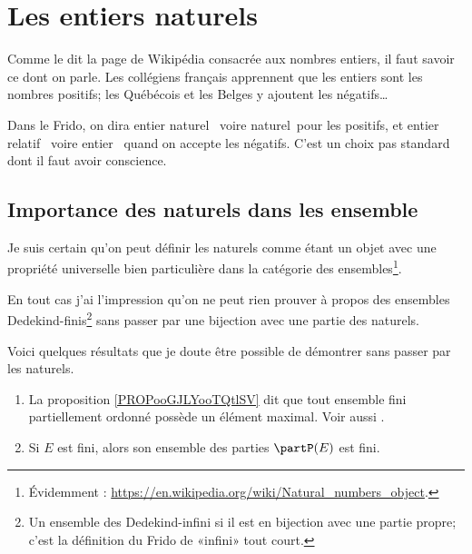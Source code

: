 

\section{Les entiers naturels}
\label{SECooPJSYooNYaIaq}

\begin{normaltext}	\label{NORMooEntierNaturel}
	Comme le dit la page de Wikipédia consacrée aux nombres entiers, il faut savoir ce dont on parle. Les collégiens français apprennent que les entiers sont les nombres positifs; les Québécois et les Belges y ajoutent les négatifs\dots

	Dans le Frido, on dira \og entier naturel \fg\ voire \og naturel\fg\ pour les positifs, et \og entier relatif \fg\ voire \og entier \fg\ quand on accepte les négatifs. C'est un choix pas standard dont il faut avoir conscience.
\end{normaltext}


\subsection{Importance des naturels dans les ensemble}

\begin{normaltext}		\label{NORMooLNLHooLYKwDu}
	Je suis certain qu'on peut définir les naturels comme étant un objet avec une propriété universelle bien particulière dans la catégorie des ensembles\footnote{Évidemment : \url{https://en.wikipedia.org/wiki/Natural_numbers_object}.}.

	En tout cas j'ai l'impression qu'on ne peut rien prouver à propos des ensembles Dedekind-finis\footnote{Un ensemble des Dedekind-infini si il est en bijection avec une partie propre; c'est la définition du Frido de «infini» tout court.} sans passer par une bijection avec une partie des naturels.

	Voici quelques résultats que je doute être possible de démontrer sans passer par les naturels.
	\begin{enumerate}
		\item
		      La proposition \ref{PROPooGJLYooTQtlSV} dit que tout ensemble fini partiellement ordonné possède un élément maximal. Voir aussi \cite{BIBooFUKSooQARznK}.
		\item
		      Si \( E\) est fini, alors son ensemble des parties \( \partP(E)\) est fini.
	\end{enumerate}
\end{normaltext}

